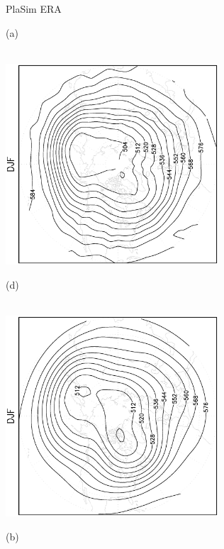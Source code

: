 \documentclass[12pt,a4paper,twoside,openright,headinclude,liststotoc,bibtotoc]{scrreprt}
\begin{document}
\begin{appendix}
\begin{figure}[b]
\hspace{3.55cm}PlaSim \vspace{0.2cm} \hspace{7.25cm} ERA \\
\parbox{8.5cm}{\hspace{0.90cm}\begin{scriptsize}(a) \end{scriptsize} \vspace{-0.5cm} \\
\includegraphics[height=7.5cm,angle=-90]
{eps/northcircysmz500DJF.eps}
}
\parbox{8.5cm}{\hspace{0.90cm}\begin{scriptsize}(d) \end{scriptsize} \vspace{-0.5cm} \\
\includegraphics[height=7.5cm,angle=-90]
{eps/northcirct21ysmz500DJF.eps}
}
\parbox{8.5cm}{\hspace{0.80cm} \begin{scriptsize}(b) \end{scriptsize} \vspace{-0.5cm} \\
}
\end{figure}
\end{appendix}
\end{document}
